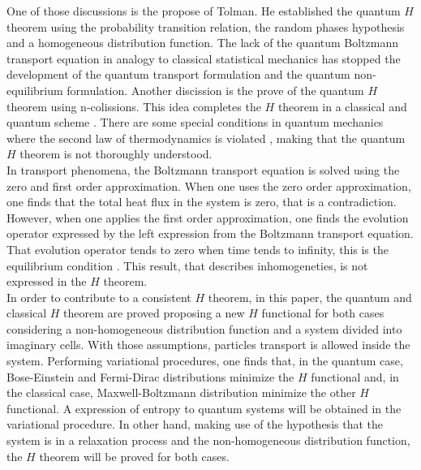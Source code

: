 \documentclass{article}
\begin{document}
One of those discussions is the propose of Tolman. He established the quantum $H$ theorem \cite{tolman} using the probability transition relation, the random phases hypothesis and a homogeneous distribution function. The lack of the quantum Boltzmann transport equation in analogy to classical statistical mechanics has stopped the development of the quantum transport formulation and the quantum non-equilibrium formulation. Another discission is the prove of the quantum $H$ theorem using n-colissions. This idea completes the $H$ theorem in a classical and quantum scheme \cite{binary}. There are some special conditions in quantum mechanics where the second law of thermodynamics is violated \cite{contradictions}, making that the quantum $H$ theorem is not thoroughly understood.\\
In transport phenomena, the Boltzmann transport equation is solved using the zero and first order approximation. When one uses the zero order approximation, one finds that the total heat flux in the system is zero, that is a contradiction. However, when one applies the first order approximation, one finds the evolution operator expressed by the left expression from the Boltzmann transport equation. That evolution operator tends to zero when time tends to infinity, this is the equilibrium condition \cite{reif}. This result, that describes inhomogeneties, is not expressed in the $H$ theorem.\\
In order to contribute to a consistent $H$ theorem, in this paper, the quantum and classical $H$ theorem are proved proposing a new $H$ functional for both cases considering a non-homogeneous distribution function and a system divided into imaginary cells. With those assumptions, particles transport is allowed inside the system. Performing variational procedures, one finds that, in the quantum case, Bose-Einstein and Fermi-Dirac distributions minimize the $H$ functional and, in the classical case, Maxwell-Boltzmann distribution minimize the other $H$ functional. A expression of entropy to quantum systems will be obtained in the variational procedure. In other hand, making use of the hypothesis that the system is in a relaxation process and the non-homogeneous distribution function, the $H$ theorem will be proved for both cases.
\end{document}

